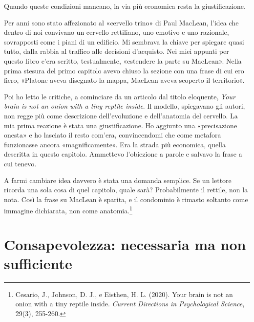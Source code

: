 Quando queste condizioni mancano, la via più economica resta la giustificazione.


\begin{casopersonale}[Un ripensamento]
Per anni sono stato affezionato al «cervello trino» di Paul MacLean, l'idea che dentro di noi convivano un cervello rettiliano, uno emotivo e uno razionale, sovrapposti come i piani di un edificio. Mi sembrava la chiave per spiegare quasi tutto, dalla rabbia al traffico alle decisioni d'acquisto. Nei miei appunti per questo libro c'era scritto, testualmente, «estendere la parte su MacLean». Nella prima stesura del primo capitolo avevo chiuso la sezione con una frase di cui ero fiero, «Platone aveva disegnato la mappa, MacLean aveva scoperto il territorio».

Poi ho letto le critiche, a cominciare da un articolo dal titolo eloquente, \textit{Your brain is not an onion with a tiny reptile inside}. Il modello, spiegavano gli autori, non regge più come descrizione dell'evoluzione e dell'anatomia del cervello. La mia prima reazione è stata una giustificazione. Ho aggiunto una «precisazione onesta» e ho lasciato il resto com'era, convincendomi che come metafora funzionasse ancora «magnificamente». Era la strada più economica, quella descritta in questo capitolo. Ammettevo l'obiezione a parole e salvavo la frase a cui tenevo.

A farmi cambiare idea davvero è stata una domanda semplice. Se un lettore ricorda una sola cosa di quel capitolo, quale sarà? Probabilmente il rettile, non la nota. Così la frase su MacLean è sparita, e il condominio è rimasto soltanto come immagine dichiarata, non come anatomia.\footnote{Cesario, J., Johnson, D. J., e Eisthen, H. L. (2020). Your brain is not an onion with a tiny reptile inside. \textit{Current Directions in Psychological Science}, 29(3), 255-260.}
\end{casopersonale}

\section{Consapevolezza: necessaria ma non sufficiente}

